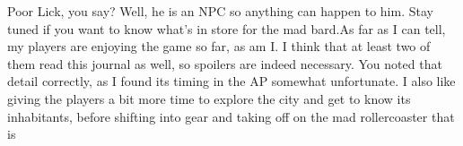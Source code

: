 Poor Lick, you say? Well, he is an NPC so anything can happen to him. Stay tuned if you want to know what's in store for the mad bard.As far as I can tell, my players are enjoying the game so far, as am I. I think that at least two of them read this journal as well, so spoilers are indeed necessary. You noted that detail correctly, as I found its timing in the AP somewhat unfortunate. I also like giving the players a bit more time to explore the city and get to know its inhabitants, before shifting into gear and taking off on the mad rollercoaster that is 